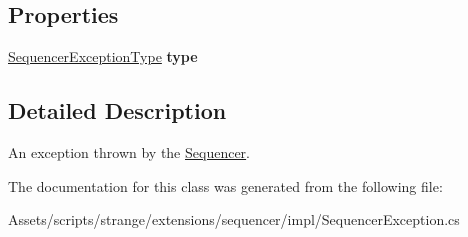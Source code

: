 \subsection*{Properties}
\begin{DoxyCompactItemize}
\item 
\hypertarget{classstrange_1_1extensions_1_1sequencer_1_1impl_1_1_sequencer_exception_a24f94543675745431c8e26addbf6cd4d}{\hyperlink{namespacestrange_1_1extensions_1_1sequencer_1_1api_aeddaacdea22f90d94ab298d24cbce41b}{Sequencer\-Exception\-Type} {\bfseries type}}\label{classstrange_1_1extensions_1_1sequencer_1_1impl_1_1_sequencer_exception_a24f94543675745431c8e26addbf6cd4d}

\end{DoxyCompactItemize}


\subsection{Detailed Description}
An exception thrown by the \hyperlink{classstrange_1_1extensions_1_1sequencer_1_1impl_1_1_sequencer}{Sequencer}. 

The documentation for this class was generated from the following file\-:\begin{DoxyCompactItemize}
\item 
Assets/scripts/strange/extensions/sequencer/impl/Sequencer\-Exception.\-cs\end{DoxyCompactItemize}
